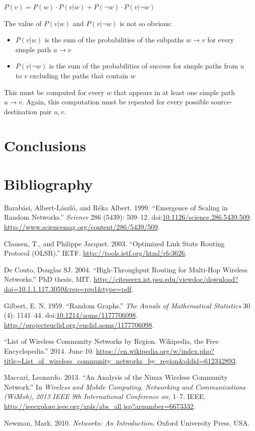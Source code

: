 \documentclass[oneside,openany]{memoir}
\begin{document}
$P(v) = P(w) \cdot P(v|w) + P(\lnot w) \cdot P(v|\lnot w)$

The value of $P(v|w)$ and $P(v|\lnot w)$ is not so obvious:

\begin{itemize}
\itemsep1pt\parskip0pt
\item
  $P(v|w)$ is the sum of the probabilities of the subpaths
  $w \rightarrow v$ for every simple path $u→v$
\item
  $P(v|\lnot w)$ is the sum of the probabilities of success for simple
  paths from $u$ to $v$ excluding the paths that contain $w$
\end{itemize}

This must be computed for every $w$ that appears in at least one simple
path $u \rightarrow v$. Again, this computation must be repeated for
every possible source-destination pair $u,v$.

\chapter{Conclusions}\label{conclusions}

\chapter*{Bibliography}\label{bibliography}

Barabási, Albert-László, and Réka Albert. 1999. ``Emergence of Scaling
in Random Networks.'' \emph{Science} 286 (5439): 509--12.
doi:\href{http://dx.doi.org/10.1126/science.286.5439.509}{10.1126/science.286.5439.509}.
\url{http://www.sciencemag.org/content/286/5439/509}.

Clausen, T., and Philippe Jacquet. 2003. ``Optimized Link State Routing
Protocol (OLSR).'' IETF. \url{http://tools.ietf.org/html/rfc3626}.

De Couto, Douglas {SJ}. 2004. ``High-Throughput Routing for Multi-Hop
Wireless Networks.'' PhD thesis, MIT.
\url{http://citeseerx.ist.psu.edu/viewdoc/download?doi=10.1.1.117.3059\&rep=rep1\&type=pdf}.

Gilbert, E. N. 1959. ``Random Graphs.'' \emph{The Annals of Mathematical
Statistics} 30 (4): 1141--44.
doi:\href{http://dx.doi.org/10.1214/aoms/1177706098}{10.1214/aoms/1177706098}.
\url{http://projecteuclid.org/euclid.aoms/1177706098}.

``List of Wireless Community Networks by Region. Wikipedia, the Free
Encyclopedia.'' 2014. June 10.
\url{https://en.wikipedia.org/w/index.php?title=List_of_wireless_community_networks_by_region\&oldid=612342893}.

Maccari, Leonardo. 2013. ``An Analysis of the Ninux Wireless Community
Network.'' In \emph{Wireless and Mobile Computing, Networking and
Communications (WiMob), 2013 IEEE 9th International Conference on},
1--7. IEEE.
\url{http://ieeexplore.ieee.org/xpls/abs_all.jsp?arnumber=6673332}.

Newman, Mark. 2010. \emph{Networks: An Introduction}. Oxford University
Press, USA.
\end{document}
